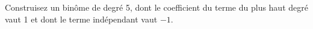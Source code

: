 %
%
    Construisez un binôme de degré 5, dont le coefficient du terme du plus haut degré vaut 1 et dont le terme indépendant vaut \(-1\).
